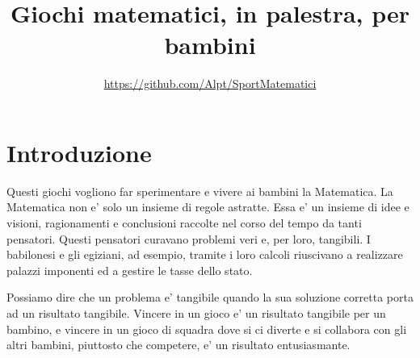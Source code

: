 \documentclass[a4paper]{article}
\begin{document}
\title{Giochi matematici, in palestra, per bambini}
\author{\small{\url{https://github.com/Alpt/SportMatematici}}}


\maketitle{}



\clearpage
{}

\let\oldsection\section
\renewcommand{\section}[1]{\oldsection{#1}\ilabel{#1}}
\let\oldsubsection\subsection
\renewcommand{\subsection}[1]{\oldsubsection{#1}\ilabel{#1}}
\let\oldsubsubsection\subsubsection
\renewcommand{\subsubsection}[1]{\oldsubsubsection{#1}\ilabel{#1}}

\section{Introduzione}

Questi giochi vogliono far sperimentare e vivere ai bambini la Matematica. La Matematica non e' solo un insieme di regole astratte. Essa e' un insieme di idee e visioni, ragionamenti e conclusioni raccolte nel corso del tempo da tanti pensatori. Questi pensatori curavano problemi veri e, per loro, tangibili. I babilonesi e gli egiziani, ad esempio, tramite i loro calcoli riuscivano a realizzare palazzi imponenti ed a gestire le tasse dello stato.

Possiamo dire che un problema e' tangibile quando la sua soluzione corretta porta ad un risultato tangibile. Vincere in un gioco e' un risultato tangibile per un bambino, e vincere in un gioco di squadra dove si ci diverte e si collabora con gli altri bambini, piuttosto che competere, e' un risultato entusiasmante.
\end{document}
